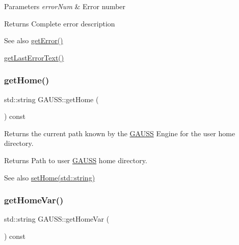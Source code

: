 \begin{DoxyParams}{Parameters}
{\em error\+Num} & Error number \\
\hline
\end{DoxyParams}
\begin{DoxyReturn}{Returns}
Complete error description
\end{DoxyReturn}
\begin{DoxySeeAlso}{See also}
\hyperlink{class_g_a_u_s_s_a214b7c251ff80099c04a49e5b5032926}{get\+Error()} 

\hyperlink{class_g_a_u_s_s_a4d8c56b05b0878aa3831ba465c409235}{get\+Last\+Error\+Text()} 
\end{DoxySeeAlso}
\mbox{\label{class_g_a_u_s_s_a917690c72f22ff82e13c49c5686af1dd}} 
\subsubsection{\texorpdfstring{get\+Home()}{getHome()}}
{\footnotesize\ttfamily std\+::string G\+A\+U\+S\+S\+::get\+Home (\begin{DoxyParamCaption}{ }\end{DoxyParamCaption}) const}



Returns the current path known by the \hyperlink{class_g_a_u_s_s}{G\+A\+U\+SS} Engine for the user home directory. 

\begin{DoxyReturn}{Returns}
Path to user \hyperlink{class_g_a_u_s_s}{G\+A\+U\+SS} home directory.
\end{DoxyReturn}
\begin{DoxySeeAlso}{See also}
\hyperlink{class_g_a_u_s_s_ac34645a05f3aca7d56d11d0b895fb33a}{set\+Home(std\+::string)} 
\end{DoxySeeAlso}
\mbox{\label{class_g_a_u_s_s_ab8df3c28586620495a09af82e4be9ab5}} 
\subsubsection{\texorpdfstring{get\+Home\+Var()}{getHomeVar()}}
{\footnotesize\ttfamily std\+::string G\+A\+U\+S\+S\+::get\+Home\+Var (\begin{DoxyParamCaption}{ }\end{DoxyParamCaption}) const}



